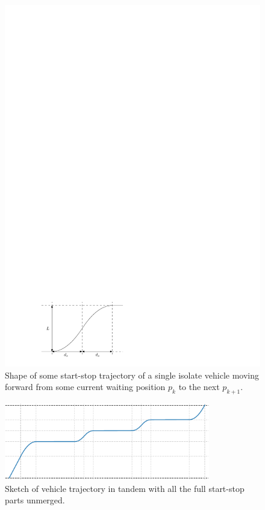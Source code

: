 \documentclass[a4paper]{article}
\theoremstyle{definition}
\theoremstyle{plain}
\begin{document}
\begin{figure}
  \centering
  \includegraphics[scale=1.0]{figures/motion/start_stop_trajectory}
  \caption{Shape of some start-stop trajectory of a single isolate vehicle
    moving forward from some current waiting position $p_{k}$ to the next
    $p_{k+1}$.}
  \label{fig:start-stop}
\end{figure}

\begin{figure}
  \centering
  \includegraphics[width=0.8\textwidth]{figures/motion/tandem_trajectory}
  \caption{Sketch of vehicle trajectory in tandem with all the full start-stop
    parts unmerged.}
  \label{fig:tandem_trajectory}
\end{figure}
\end{document}
